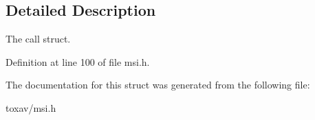 \subsection{Detailed Description}
The call struct. 

Definition at line 100 of file msi.\+h.



The documentation for this struct was generated from the following file\+:\begin{DoxyCompactItemize}
\item 
toxav/msi.\+h\end{DoxyCompactItemize}
